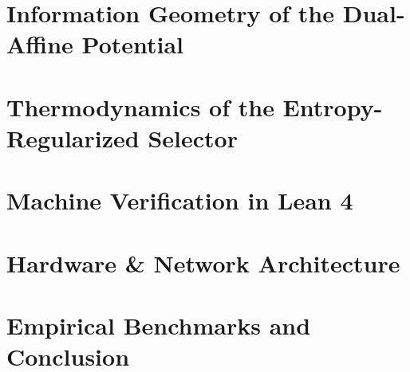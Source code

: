 \documentclass[conference]{IEEEtran}
\begin{document}
\section{Information Geometry of the Dual-Affine Potential}


\section{Thermodynamics of the Entropy-Regularized Selector}


\section{Machine Verification in Lean 4}


\section{Hardware \& Network Architecture}


\section{Empirical Benchmarks and Conclusion}





\end{document}
